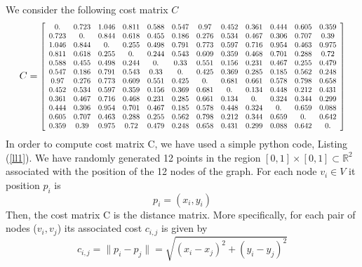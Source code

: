 \documentclass[12pt]{article}
\begin{document}
We consider the following cost matrix $C$
\begin{equation}
    C = 
\resizebox{0.9\linewidth}{!}{$
        \left[ \begin {array}{cccccccccccc} 
        
         0.  &  0.723& 1.046& 0.811& 0.588& 0.547& 0.97&  0.452& 0.361& 0.444& 0.605& 0.359\\
         0.723 &0.   & 0.844 &0.618 &0.455 &0.186 &0.276 &0.534 &0.467 &0.306 &0.707& 0.39 \\
         1.046 &0.844 &0.    &0.255 &0.498 &0.791 &0.773 &0.597 &0.716 &0.954 &0.463 &0.975\\
         0.811 &0.618 &0.255 &0.    &0.244 &0.543 &0.609 &0.359 &0.468 &0.701 &0.288 &0.72 \\
         0.588 &0.455 &0.498 &0.244 &0.    &0.33  &0.551 &0.156 &0.231 &0.467 &0.255 &0.479\\
         0.547 &0.186 &0.791 &0.543 &0.33  &0.    &0.425 &0.369 &0.285 &0.185 &0.562 &0.248\\
         0.97  &0.276 &0.773 &0.609 &0.551 &0.425 &0.    &0.681 &0.661 &0.578 &0.798 &0.658\\
         0.452 &0.534 &0.597 &0.359 &0.156 &0.369 &0.681 &0.    &0.134 &0.448 &0.212 &0.431\\
         0.361 &0.467 &0.716 &0.468 &0.231 &0.285 &0.661 &0.134 &0.    &0.324 &0.344 &0.299\\
         0.444 &0.306 &0.954 &0.701 &0.467 &0.185 &0.578 &0.448 &0.324 &0.    &0.659 &0.088\\
         0.605 &0.707 &0.463 &0.288 &0.255 &0.562 &0.798 &0.212 &0.344 &0.659 &0.    &0.642\\
         0.359 &0.39  &0.975 &0.72  &0.479 &0.248 &0.658 &0.431 &0.299 &0.088 &0.642 &0.\\
        
        
        \end {array}
        \right]     
$}

\end{equation}
In order to compute cost matrix C, we have used a simple python code, Listing (\ref{ll1}). We have randomly generated 12 points in the region $[0,1]\times[0,1] \subset \mathbb{R}^{2}$ associated with the position of the 12 nodes of the graph. For each node $v_{i} \in V$ it position $p_{i}$ is 
\begin{equation}
    p_{i} = (x_{i},y_{i})
\end{equation}
Then, the cost matrix C is the distance matrix. More specifically, for each pair of nodes ($v_{i},v_{j}$) its associated cost $c_{i,j}$ is given by
\begin{equation}
    c_{i,j} = \|p_{i}-p_{j}\| = \sqrt{(x_{i} - x_{j})^{2} + (y_{i} - y_{j})^{2}}
\end{equation}
\end{document}
